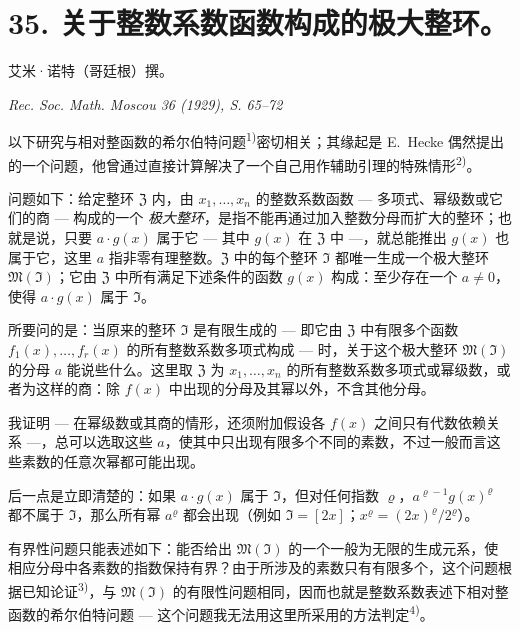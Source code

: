 \documentclass[11pt]{article}
\begin{document}
\setcounter{footnote}{0}

\section*{35. 关于整数系数函数构成的极大整环。}

\begin{center}
艾米·诺特（哥廷根）撰。\par
\emph{Rec. Soc. Math. Moscou 36 (1929), S. 65--72}
\end{center}




以下研究与相对整函数的希尔伯特问题\textsuperscript{1)}密切相关；其缘起是 E.\ Hecke 偶然提出的一个问题，他曾通过直接计算解决了一个自己用作辅助引理的特殊情形\textsuperscript{2)}。

问题如下：给定整环 $\mathfrak{Z}$ 内，由 $x_1,\ldots,x_n$ 的整数系数函数 --- 多项式、幂级数或它们的商 --- 构成的一个 \textit{极大整环}，是指不能再通过加入整数分母而扩大的整环；也就是说，只要 $a \cdot g(x)$ 属于它 --- 其中 $g(x)$ 在 $\mathfrak{Z}$ 中 ---，就总能推出 $g(x)$ 也属于它，这里 $a$ 指非零有理整数。$\mathfrak{Z}$ 中的每个整环 $\mathfrak{I}$ 都唯一生成一个极大整环 $\mathfrak{M}(\mathfrak{I})$；它由 $\mathfrak{Z}$ 中所有满足下述条件的函数 $g(x)$ 构成：至少存在一个 $a \neq 0$，使得 $a \cdot g(x)$ 属于 $\mathfrak{I}$。

所要问的是：当原来的整环 $\mathfrak{I}$ 是有限生成的 --- 即它由 $\mathfrak{Z}$ 中有限多个函数 $f_1(x),\ldots,f_r(x)$ 的所有整数系数多项式构成 --- 时，关于这个极大整环 $\mathfrak{M}(\mathfrak{I})$ 的分母 $a$ 能说些什么。这里取 $\mathfrak{Z}$ 为 $x_1,\ldots,x_n$ 的所有整数系数多项式或幂级数，或者为这样的商：除 $f(x)$ 中出现的分母及其幂以外，不含其他分母。

我证明 --- 在幂级数或其商的情形，还须附加假设各 $f(x)$ 之间只有代数依赖关系 ---，总可以选取这些 $a$，使其中只出现有限多个不同的素数，不过一般而言这些素数的任意次幂都可能出现。

后一点是立即清楚的：如果 $a\cdot g(x)$ 属于 $\mathfrak{I}$，但对任何指数 $\varrho$，$a^{\varrho-1}g(x)^{\varrho}$ 都不属于 $\mathfrak{I}$，那么所有幂 $a^{\varrho}$ 都会出现（例如 $\mathfrak{I}=[2x]$；$x^{\varrho}=(2x)^{\varrho}/2^{\varrho}$）。

有界性问题只能表述如下：能否给出 $\mathfrak{M}(\mathfrak{I})$ 的一个一般为无限的生成元系，使相应分母中各素数的指数保持有界？由于所涉及的素数只有有限多个，这个问题根据已知论证\textsuperscript{3)}，与 $\mathfrak{M}(\mathfrak{I})$ 的有限性问题相同，因而也就是整数系数表述下相对整函数的希尔伯特问题 --- 这个问题我无法用这里所采用的方法判定\textsuperscript{4)}。
\end{document}

